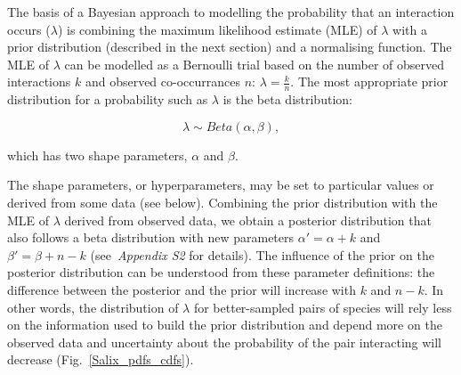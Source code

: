 \documentclass[12pt]{article}
\begin{document}
\begin{spacing}{2.0}

    The basis of a Bayesian approach to modelling the probability that an interaction occurs ($\lambda$) is combining the maximum likelihood estimate (MLE) of $\lambda$ with a prior distribution (described in the next section) and a normalising function. The MLE of $\lambda$ can be modelled as a Bernoulli trial based on the number of observed interactions $k$ and observed co-occurrances $n$: $\lambda = \frac{k}{n}$. The most appropriate prior distribution for a probability such as $\lambda$ is the beta distribution:

    \begin{equation}
          \lambda \sim Beta(\alpha,\beta) , \label{prior}
        \end{equation}

        \noindent which has two shape parameters, $\alpha$ and $\beta$. 

    The shape parameters, or hyperparameters, may be set to particular values or derived from some data (see below). Combining the prior distribution with the MLE of $\lambda$ derived from observed data, we obtain a posterior distribution that also follows a beta distribution with new parameters $\alpha'= \alpha+k$ and $\beta'=\beta+n-k$ (see~\emph{Appendix S2} for details). The influence of the prior on the posterior distribution can be understood from these parameter definitions: the difference between the posterior and the prior will increase with $k$ and $n-k$. In other words, the distribution of $\lambda$ for better-sampled pairs of species will rely less on the information used to build the prior distribution and depend more on the observed data and uncertainty about the probability of the pair interacting will decrease (Fig.~\ref{Salix_pdfs_cdfs}). 


\end{spacing}
\end{document}

